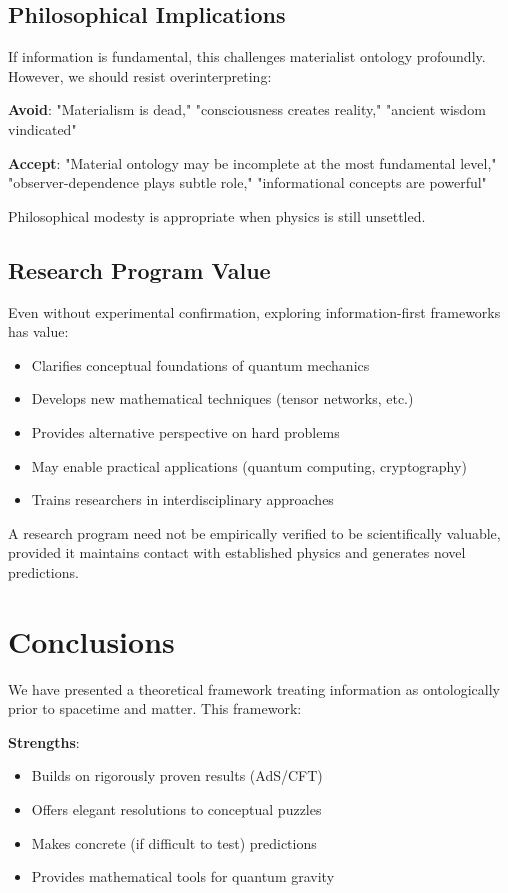 \documentclass[12pt,twocolumn]{article}
\theoremstyle{definition}
\theoremstyle{remark}
\begin{document}
\subsection{Philosophical Implications}

If information is fundamental, this challenges materialist ontology profoundly. However, we should resist overinterpreting:

\textbf{Avoid}: "Materialism is dead," "consciousness creates reality," "ancient wisdom vindicated"

\textbf{Accept}: "Material ontology may be incomplete at the most fundamental level," "observer-dependence plays subtle role," "informational concepts are powerful"

Philosophical modesty is appropriate when physics is still unsettled.

\subsection{Research Program Value}

Even without experimental confirmation, exploring information-first frameworks has value:

\begin{itemize}
\item Clarifies conceptual foundations of quantum mechanics
\item Develops new mathematical techniques (tensor networks, etc.)
\item Provides alternative perspective on hard problems
\item May enable practical applications (quantum computing, cryptography)
\item Trains researchers in interdisciplinary approaches
\end{itemize}

A research program need not be empirically verified to be scientifically valuable, provided it maintains contact with established physics and generates novel predictions.

\section{Conclusions}

We have presented a theoretical framework treating information as ontologically prior to spacetime and matter. This framework:

\textbf{Strengths}:
\begin{itemize}
\item Builds on rigorously proven results (AdS/CFT)
\item Offers elegant resolutions to conceptual puzzles
\item Makes concrete (if difficult to test) predictions
\item Provides mathematical tools for quantum gravity
\end{itemize}
\end{document}
